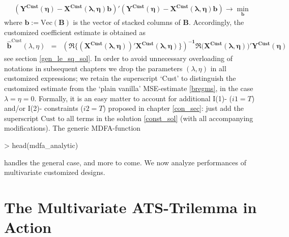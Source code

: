 \documentclass[a4paper]{book}
\begin{document}
\begin{eqnarray}\label{regcust}
(\mathbf{Y^{\textrm{Cust}}(\eta)-\mathbf{X}^{\textrm{Cust}}(\lambda,\eta)b})'(\mathbf{Y^{\textrm{Cust}}(\eta)-\mathbf{X}^{\textrm{Cust}}(\lambda,\eta)b})\to\min_{\mathbf{b}}
\end{eqnarray}
where $\mathbf{b}:=\textrm{Vec}(\mathbf{B})$ is the vector of stacked columns of $\mathbf{B}$. Accordingly, the customized coefficient estimate is obtained as 
\begin{eqnarray}\label{bregcust}
\mathbf{\hat{b}}^{\textrm{Cust}}(\lambda,\eta)&=&\mathbf{\left(\Re\Bigg\{(\mathbf{X}^{\textrm{Cust}}(\lambda,\eta))' \mathbf{X}^{\textrm{Cust}}(\lambda,\eta)\Bigg\}\right)^{-1}\Re(\mathbf{X}^{\textrm{Cust}}(\lambda,\eta)})'
\mathbf{Y^{\textrm{Cust}}(\eta)}
\end{eqnarray}
see section \ref{gen_le_sq_sol}. In order to avoid unnecessary overloading of notations in subsequent chapters we drop the parameters $(\lambda,\eta)$ in all customized expressions; we retain the superscript `Cust' to distinguish the customized estimate from the `plain vanilla' MSE-estimate \ref{bregms}, in the case $\lambda=\eta=0$.  Formally, it is an easy matter to account for additional I(1)- ($i1=T$) and/or I(2)- constraints ($i2=T$) proposed in chapter \ref{con_sec}: just add the superscript $\textrm{Cust}$ to all terms in the solution \ref{const_sol} (with all accompanying modifications). The generic MDFA-function 
\begin{Schunk}
\begin{Sinput}
> head(mdfa_analytic)
\end{Sinput}
\begin{Soutput}
1 function (L, lambda, weight_func, Lag, Gamma, eta, cutoff, i1,             
2     i2, weight_constraint, lambda_cross, lambda_decay, lambda_smooth,      
3     lin_eta, shift_constraint, grand_mean, b0_H0, c_eta, weight_structure, 
4     white_noise, synchronicity, lag_mat, troikaner)                        
5 {                                                                          
6     lambda <- abs(lambda)                                                  
\end{Soutput}
\end{Schunk}
handles the general case, and more to come. We now analyze performances of multivariate customized designs. 




\section{The Multivariate ATS-Trilemma in Action}\label{mul_ats_tr_i_a}
\end{document}
